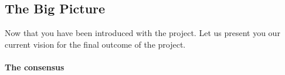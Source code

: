 
\subsection{The Big Picture}
Now that you have been introduced with the project. Let us present you our current vision for the final outcome of the project.

\paragraph{The consensus}


